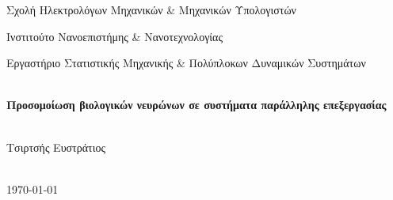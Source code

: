 \documentclass[12pt,a4paper]{article}
\begin{document}
\begin{titlepage}
\begin{minipage}[t]{0.45\textwidth}
\centering
\vspace{\baselineskip}
Σχολή Ηλεκτρολόγων Μηχανικών \& Μηχανικών Υπολογιστών
\end{minipage}\hfill
\begin{minipage}[t]{0.45\textwidth}
\centering
\vspace{\baselineskip}
Ινστιτούτο Νανοεπιστήμης \& Νανοτεχνολογίας

\vspace{0.1cm}

Εργαστήριο Στατιστικής Μηχανικής \& Πολύπλοκων Δυναμικών Συστημάτων
\end{minipage}

\vspace{\baselineskip}
\vspace{\baselineskip}
\vspace{\baselineskip}

\HRule \\[0.4cm]
{ \huge \bfseries Προσομοίωση βιολογικών νευρώνων σε συστήματα παράλληλης επεξεργασίας}\\[0.4cm] %
\HRule \\[1.5cm]
 

\begin{minipage}{0.4\textwidth}
\begin{flushleft} \large
\centering
Τσιρτσής Ευστράτιος %
\end{flushleft}

\end{minipage}\\[2cm]



{\large \today}\\[2cm] %

\vfill %

\end{titlepage}
\end{document}
